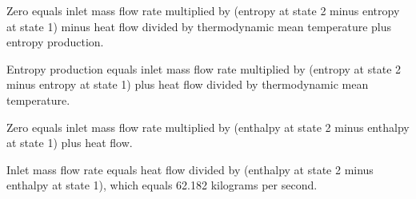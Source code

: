 Zero equals inlet mass flow rate multiplied by (entropy at state 2 minus entropy at state 1) minus heat flow divided by thermodynamic mean temperature plus entropy production.  

Entropy production equals inlet mass flow rate multiplied by (entropy at state 2 minus entropy at state 1) plus heat flow divided by thermodynamic mean temperature.  

Zero equals inlet mass flow rate multiplied by (enthalpy at state 2 minus enthalpy at state 1) plus heat flow.  

Inlet mass flow rate equals heat flow divided by (enthalpy at state 2 minus enthalpy at state 1), which equals 62.182 kilograms per second.